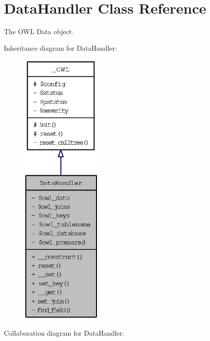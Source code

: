 \hypertarget{classDataHandler}{
\section{DataHandler Class Reference}
\label{classDataHandler}
}
The OWL Data object.  


Inheritance diagram for DataHandler:\nopagebreak
\begin{figure}[H]
\begin{center}
\leavevmode
\includegraphics[height=400pt]{classDataHandler__inherit__graph}
\end{center}
\end{figure}
Collaboration diagram for DataHandler:\nopagebreak
